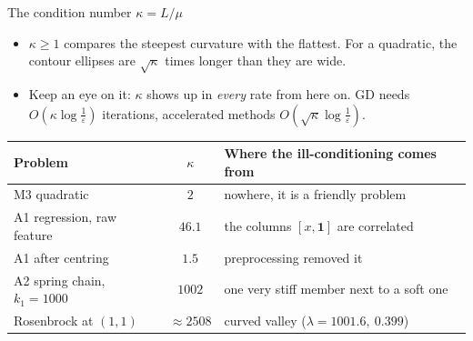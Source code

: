 \begin{frame}{The condition number $\kappa = L/\mu$}
  \begin{itemize}\small
    \item $\kappa\ge1$ compares the steepest curvature with the flattest. For a quadratic, the contour ellipses
          are $\sqrt\kappa$ times longer than they are wide.
    \item Keep an eye on it: $\kappa$ shows up in \emph{every} rate from here on. GD needs $O(\kappa\log\frac1\varepsilon)$ iterations,
          accelerated methods $O(\sqrt\kappa\log\frac1\varepsilon)$.
  \end{itemize}
  \vspace{2pt}
  \centering\small
  \begin{tabular}{@{}l c l@{}}
    \toprule
    Problem & $\kappa$ & Where the ill-conditioning comes from \\
    \midrule
    M3 quadratic & $2$ & nowhere, it is a friendly problem \\
    A1 regression, raw feature & $46.1$ & the columns $[x,\mathbf 1]$ are correlated \\
    A1 after centring & $1.5$ & preprocessing removed it \\
    A2 spring chain, $k_1 = 1000$ & $1002$ & one very stiff member next to a soft one \\
    Rosenbrock at $(1,1)$ & $\approx2508$ & curved valley ($\lambda = 1001.6,\ 0.399$) \\
    \bottomrule
  \end{tabular}
\end{frame}
